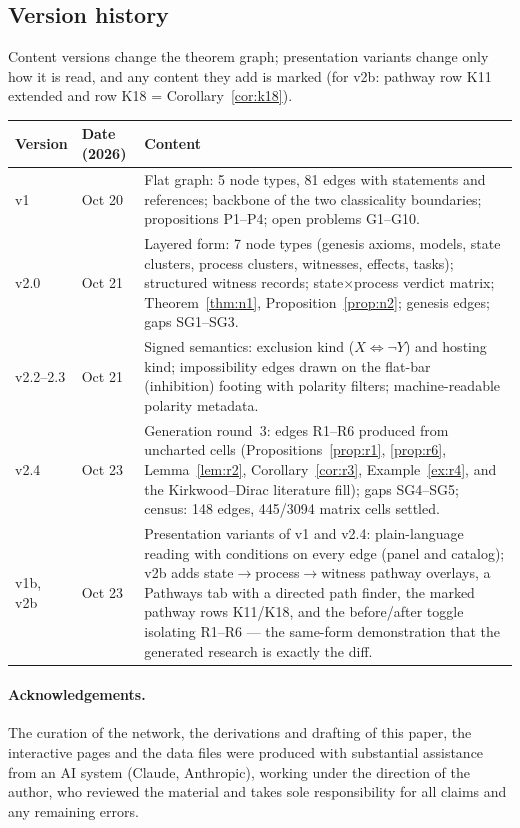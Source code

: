 \documentclass[11pt,a4paper]{article}
\theoremstyle{definition}
\begin{document}
\subsection*{Version history}

Content versions change the theorem graph; presentation variants change only
how it is read, and any content they add is marked (for v2b: pathway row K11
extended and row K18 = Corollary~\ref{cor:k18}).

\begin{center}\small
\begin{tabular}{@{}llp{8.6cm}@{}}
\toprule
Version & Date (2026) & Content \\
\midrule
v1 & Oct 20 & Flat graph: 5 node types, 81 edges with statements and
references; backbone of the two classicality boundaries; propositions
P1--P4; open problems G1--G10. \\
v2.0 & Oct 21 & Layered form: 7 node types (genesis axioms, models, state
clusters, process clusters, witnesses, effects, tasks); structured witness
records; state$\times$process verdict matrix; Theorem~\ref{thm:n1},
Proposition~\ref{prop:n2}; genesis edges; gaps SG1--SG3. \\
v2.2--2.3 & Oct 21 & Signed semantics: exclusion kind ($X \Leftrightarrow
\neg Y$) and hosting kind; impossibility edges drawn on the flat-bar
(inhibition) footing with polarity filters; machine-readable polarity
metadata. \\
v2.4 & Oct 23 & Generation round~3: edges R1--R6 produced from uncharted
cells (Propositions~\ref{prop:r1}, \ref{prop:r6},
Lemma~\ref{lem:r2}, Corollary~\ref{cor:r3}, Example~\ref{ex:r4}, and the
Kirkwood--Dirac literature fill); gaps SG4--SG5; census: 148 edges,
445/3094 matrix cells settled. \\
v1b, v2b & Oct 23 & Presentation variants of v1 and v2.4: plain-language
reading with conditions on every edge (panel and catalog); v2b adds
state$\to$process$\to$witness pathway overlays, a Pathways tab with a
directed path finder, the marked pathway rows K11/K18, and the
before/after toggle isolating R1--R6 --- the same-form demonstration that
the generated research is exactly the diff. \\
\bottomrule
\end{tabular}
\end{center}

\paragraph{Acknowledgements.} The curation of the network, the derivations and
drafting of this paper, the interactive pages and the data files were produced
with substantial assistance from an AI system (Claude, Anthropic), working
under the direction of the author, who reviewed the material and takes sole
responsibility for all claims and any remaining errors.



\end{document}
